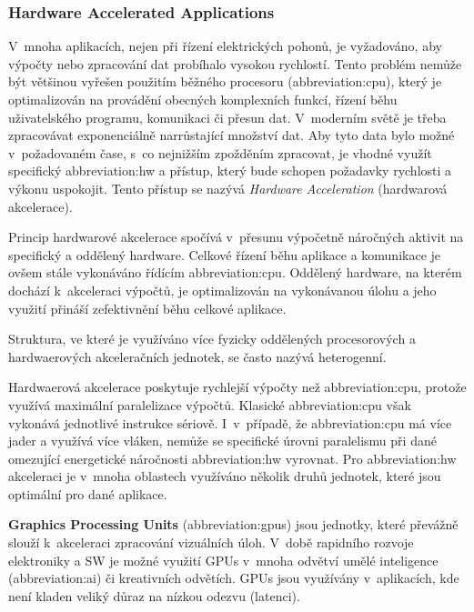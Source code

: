 \documentclass[a4paper, twoside, 11pt]{article}
\begin{document}
		\subsubsection{Hardware Accelerated Applications}\label{subsec:hardware-accelerated-applications}
		V~mnoha aplikacích, nejen při řízení elektrických pohonů, je vyžadováno, aby výpočty nebo zpracování dat probíhalo vysokou rychlostí. Tento problém nemůže být většinou vyřešen použitím běžného procesoru (\gls{abbreviation:cpu}), který je optimalizován na provádění obecných komplexních funkcí, řízení běhu uživatelského programu, komunikaci či přesun dat. V~moderním světě je třeba zpracovávat exponenciálně narrůstající množství dat. Aby tyto data bylo možné v~požadovaném čase, s~co nejnižším zpožděním zpracovat, je vhodné využít specifický \gls{abbreviation:hw} a přístup, který bude schopen požadavky rychlosti a výkonu uspokojit. Tento přístup se nazývá \textit{Hardware Acceleration} (hardwarová akcelerace). \cite{xilinx-accelerated-computing}\par
		Princip hardwarové akcelerace spočívá v~přesunu výpočetně náročných aktivit na specifický a oddělený hardware. Celkové řízení běhu aplikace a komunikace je ovšem stále vykonáváno řídícím \gls{abbreviation:cpu}. Oddělený hardware, na kterém dochází k~akceleraci výpočtů, je optimalizován na vykonávanou úlohu a jeho využití přináší zefektivnění běhu celkové aplikace. \cite{xilinx-accelerated-computing}\par
		Struktura, ve které je využíváno více fyzicky oddělených procesorových a hardwaerových akceleračních jednotek, se často nazývá heterogenní. \cite{xilinx-accelerated-computing}\par
		Hardwaerová akcelerace poskytuje rychlejší výpočty než \gls{abbreviation:cpu}, protože využívá maximální paralelizace výpočtů. Klasické \gls{abbreviation:cpu} však vykonává jednotlivé instrukce sériově. I~v~případě, že \gls{abbreviation:cpu} má více jader a využívá více vláken, nemůže se specifické úrovni paralelismu při dané omezující energetické náročnosti \gls{abbreviation:hw} vyrovnat.
		Pro \gls{abbreviation:hw} akceleraci je v~mnoha oblastech využíváno několik druhů jednotek, které jsou optimální pro dané aplikace.\par
		\textbf{Graphics Processing Units} (\gls{abbreviation:gpus}) jsou jednotky, které převážně slouží k~akceleraci zpracování vizuálních úloh. V~době rapidního rozvoje elektroniky a SW je možné využití GPUs v~mnoha odvětví umělé inteligence (\gls{abbreviation:ai}) či kreativních odvětích. GPUs jsou využívány v~aplikacích, kde není kladen veliký důraz na nízkou odezvu (latenci). \cite{xilinx-accelerated-computing}\par
\end{document}
